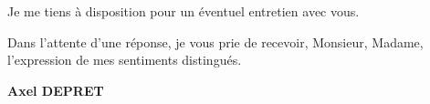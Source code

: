 \documentclass[11pt]{letter}
\begin{document}

Je me tiens à disposition pour un éventuel entretien avec vous. \par

Dans l'attente d'une réponse, je vous prie de recevoir, Monsieur, Madame, l’expression de mes
sentiments distingués.

 \begin{flushright}
 {\bfseries Axel DEPRET}\\
 \end{flushright}

 \vfill
 
\end{document}
